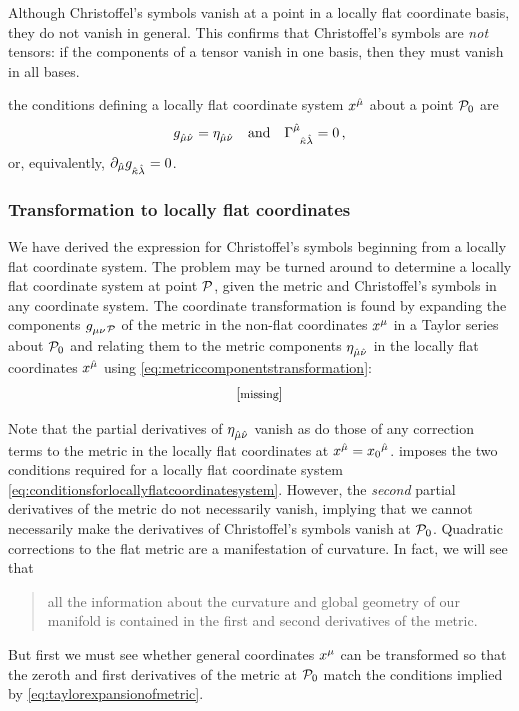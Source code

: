  Although Christoffel's symbols vanish at a point in a locally flat coordinate basis, they do not vanish in general. This confirms that Christoffel's symbols are \emph{not} tensors: if the components of a tensor vanish in one basis, then they must vanish in all bases.

 the conditions defining a locally flat coordinate system $\tvec\pos{\ridx\mu}$ about a point $\mathcal{P}_0$ are
%
\begin{equation}\label{eq:conditionsforlocallyflatcoordinatesystem}
  \tmetric{\ridx\mu}{\ridx\nu} = \tminkmet{\ridx\mu}{\ridx\nu}\quad\text{and}\quad
  \tchris{\ridx\mu}{\ridx\kappa}{\ridx\lambda} = 0\,,
\end{equation}
%
or, equivalently, $\ipd{\ridx\mu}\tmetric{\ridx\kappa}{\ridx\lambda} = 0$.


\subsubsection{Transformation to locally flat coordinates}
%
We have derived the expression for Christoffel's symbols beginning from a locally flat coordinate system. The problem may be turned around to determine a locally flat coordinate system at point $\mathcal{P}$, given the metric and Christoffel's symbols in any coordinate system. The coordinate transformation is found by expanding the components $\tmetric\mu\nu_{\point P}$ of the metric in the non-flat coordinates $\tvec\pos\mu$ in a Taylor series about $\mathcal{P}_0$ and relating them to the metric components $\tminkmet{\ridx\mu}{\ridx\nu}$ in the locally flat coordinates $\tvec\pos{\ridx\mu}$ using \cref{eq:metriccomponentstransformation}:
%
\begin{equation}\label{eq:taylorexpansionofmetric}
  \eqtxt{missing}
\end{equation}

Note that the partial derivatives of $\tminkmet{\ridx\mu}{\ridx\nu}$ vanish as do those of any correction terms to the metric in the locally flat coordinates at $\tvec\pos{\ridx\mu} = \tvec{{\pos_0}}{\ridx\mu}$.  imposes the two conditions required for a locally flat coordinate system \cref{eq:conditionsforlocallyflatcoordinatesystem}. However, the \emph{second} partial derivatives of the metric do not necessarily vanish, implying that we cannot necessarily make the derivatives of Christoffel's symbols vanish at $\mathcal{P}_0$. Quadratic corrections to the flat metric are a manifestation of curvature. In fact, we will see that 
%
\begin{quotation}
  all the information about the curvature and global geometry of our manifold is contained in the first and second derivatives of the metric.
\end{quotation}
%
But first we must see whether general coordinates $\tvec\pos\mu$ can be transformed so that the zeroth and first derivatives of the metric at $\mathcal{P}_0$ match the conditions implied by \cref{eq:taylorexpansionofmetric}.

